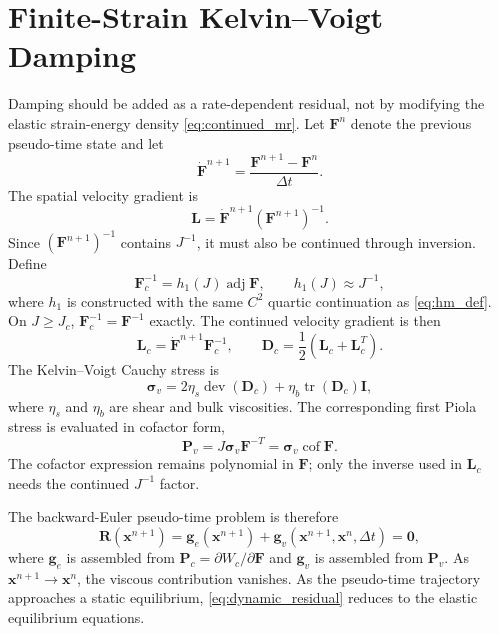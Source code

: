 \documentclass[11pt]{article}
\newcommand{\F}{\bm F}
\newcommand{\I}{\bm I}
\newcommand{\Pola}{\bm P}
\newcommand{\sig}{\bm\sigma}
\newcommand{\cof}{\operatorname{cof}}
\newcommand{\tr}{\operatorname{tr}}
\newcommand{\dev}{\operatorname{dev}}
\begin{document}
\section{Finite-Strain Kelvin--Voigt Damping}

Damping should be added as a rate-dependent residual, not by modifying the
elastic strain-energy density \eqref{eq:continued_mr}. Let $\F^n$ denote the
previous pseudo-time state and let
\begin{equation}
  \dot{\F}^{n+1}
  =
  \frac{\F^{n+1}-\F^n}{\Delta t}.
\end{equation}
The spatial velocity gradient is
\begin{equation}
  \bm L = \dot{\F}^{n+1}(\F^{n+1})^{-1}.
\end{equation}
Since $(\F^{n+1})^{-1}$ contains $J^{-1}$, it must also be continued through
inversion. Define
\begin{equation}
  \F^{-1}_c = h_1(J)\operatorname{adj}\F,
  \qquad h_1(J)\approx J^{-1},
  \label{eq:continued_inverse}
\end{equation}
where $h_1$ is constructed with the same $C^2$ quartic continuation as
\eqref{eq:hm_def}. On $J\ge J_c$, $\F^{-1}_c=\F^{-1}$ exactly. The continued
velocity gradient is then
\begin{equation}
  \bm L_c=\dot{\F}^{n+1}\F^{-1}_c,
  \qquad
  \bm D_c=\frac{1}{2}(\bm L_c+\bm L_c^T).
\end{equation}
The Kelvin--Voigt Cauchy stress is
\begin{equation}
  \sig_v
  =
  2\eta_s\dev(\bm D_c)
  +
  \eta_b\tr(\bm D_c)\I,
  \label{eq:kv_cauchy}
\end{equation}
where $\eta_s$ and $\eta_b$ are shear and bulk viscosities. The corresponding
first Piola stress is evaluated in cofactor form,
\begin{equation}
  \Pola_v
  =
  J\sig_v\F^{-T}
  =
  \sig_v\cof\F.
  \label{eq:kv_piola}
\end{equation}
The cofactor expression remains polynomial in $\F$; only the inverse used in
$\bm L_c$ needs the continued $J^{-1}$ factor.

The backward-Euler pseudo-time problem is therefore
\begin{equation}
  \boxed{
  \bm R(\bm x^{n+1})
  =
  \bm g_e(\bm x^{n+1})
  +
  \bm g_v(\bm x^{n+1},\bm x^n,\Delta t)
  =
  \bm0,
  }
  \label{eq:dynamic_residual}
\end{equation}
where $\bm g_e$ is assembled from $\Pola_c=\partial W_c/\partial\F$ and
$\bm g_v$ is assembled from $\Pola_v$. As $\bm x^{n+1}\rightarrow \bm x^n$,
the viscous contribution vanishes. As the pseudo-time trajectory approaches a
static equilibrium, \eqref{eq:dynamic_residual} reduces to the elastic
equilibrium equations.
\end{document}
